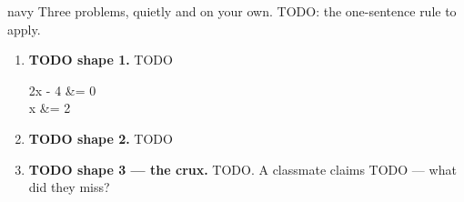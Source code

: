 \documentclass[10pt]{article}
\begin{document}
\boxguard[22]
\begin{scenariobox}{navy}
Three problems, quietly and on your own. TODO: the one-sentence rule to apply.
\begin{enumerate}[leftmargin=1.9em, itemsep=9pt]
  \item \textbf{TODO shape 1.} TODO \blank{1.2cm}
        \begin{work}
          2x - 4 &= 0 \\
               x &= 2
        \end{work}
  \item \textbf{TODO shape 2.} TODO \blank{1.2cm}
  \item \textbf{TODO shape 3 --- the crux.} TODO. A classmate claims TODO --- what did they miss?
        \par{}
\end{enumerate}
\end{scenariobox}
\end{document}
